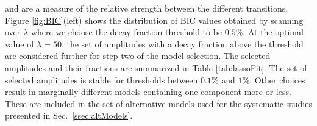and are a measure of the relative strength between the different transitions. 
Figure \ref{fig:BIC}(left) shows the distribution of BIC values obtained by scanning over $\lambda$
where we choose the decay fraction threshold to be $0.5 \%$.
At the optimal value of $\lambda=50$, the set of amplitudes with a decay fraction above the threshold 
are considered further for step two of the model selection.
The selected amplitudes and their fractions are summarized in Table \ref{tab:lassoFit}.
The set of selected amplitudes is stable for thresholds between $0.1\%$ and $1\%$. 
Other choices result in marginally different models containing one component more or less. These are included in the set of alternative models used for the systematic studies presented in Sec.~\ref{ssec:altModels}.

